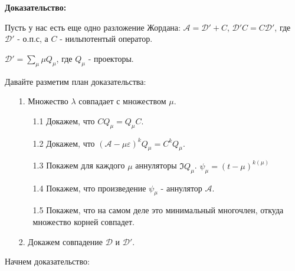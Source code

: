 \textbf{Доказательство:}

Пусть у нас есть еще одно разложение Жордана: $\mathcal{A} = \mathcal{D}'  + C$, $\mathcal{D}'C=C\mathcal{D}'$, где $\mathcal{D}'$ - о.п.с, а $C$ - нильпотентый оператор.

$\mathcal{D'} = \sum\limits_{\mu}\mu Q_\mu$, где $Q_{\mu}$ - проекторы.

Давайте разметим план доказательства:
\begin{enumerate}
    \item[1.] Множество $\lambda$ совпадает с множеством $\mu$.
    \begin{enumerate}
        \item[1.1] Докажем, что $CQ_{\mu}=Q_{\mu}C$.
        \item[1.2] Докажем, что $(\mathcal{A-\mu\varepsilon})^kQ_{\mu} = C^kQ_{\mu}$.
        \item[1.3] Покажем для каждого $\mu$ аннуляторы $\Im Q_{\mu}$. $\psi_{\mu} = (t-\mu)^{k(\mu)}$
        \item[1.4] Покажем, что произведение $\psi_{\mu}$ - аннулятор $\mathcal{A}$.
        \item[1.5] Покажем, что на самом деле это минимальный многочлен, откуда множество корней совпадет.
    \end{enumerate}
    \item [2.] Докажем совпадение $\mathcal{D}$ и $\mathcal{D}'$.
\end{enumerate}
Начнем доказательство:
